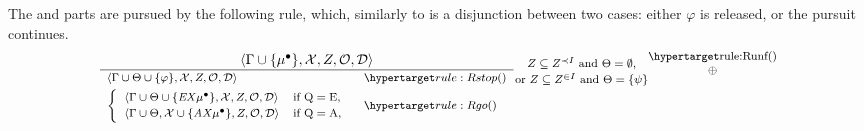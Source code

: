 The  and  parts are pursued by the following rule, which, similarly to  is a disjunction between two cases: either $\varphi$ is released, or the pursuit continues. %
\vspace{-0.2cm}
\[
\footnotesize
\frac{\tup{\Gamma\cup\{\mu^\bullet\}}{\Ctx}{Z}{\obligations}{\Deadline}}
{\begin{array}{ll}
\tup{\Gamma\cup\Theta\cup\{\varphi\}}{\Ctx}{Z}{\obligations}{\Deadline} & \ruleanchor{Rstop}\\[3pt]
\left\{
\begin{array}{ll}
\tup{\Gamma\cup\Theta\cup\{\EX\mu^\bullet\}}{\Ctx}{Z}{\obligations}{\Deadline} & \text{if } \mathrm{Q}=\mathrm{E},\\[2pt]
\tup{\Gamma\cup\Theta}{\Ctx\cup\{\AX\mu^\bullet\}}{Z}{\obligations}{\Deadline} & \text{if } \mathrm{Q}=\mathrm{A},
\end{array}
\right.
& \ruleanchor{Rgo}
\end{array}}
\raisebox{-2ex}{\shortstack{$Z\subseteq\ZltI$ and $\Theta=\emptyset$,\\
or $Z\subseteq\ZinI$ and $\Theta=\{\psi\}$}}
\shortstack{\ruleanchor{Runf}\\\ORn}
\]






